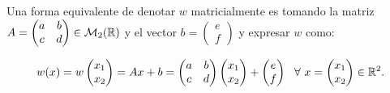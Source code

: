 Una forma equivalente de denotar $w$ matricialmente es tomando la matriz $A=\begin{pmatrix}
    a & b \\
    c & d
\end{pmatrix}\in\mathcal{M}_2(\mathbb{R})$ y el vector $b=\begin{pmatrix}
    e \\
    f
\end{pmatrix}$ y expresar $w$ como:

\begin{equation}
    w(x) =
    w\begin{pmatrix}
        x_1 \\
        x_2
    \end{pmatrix} = Ax + b = \begin{pmatrix}
        a & b \\
        c & d
    \end{pmatrix}\begin{pmatrix}
        x_1 \\
        x_2
    \end{pmatrix}+\begin{pmatrix}
        e \\
        f
    \end{pmatrix} \ \ \forall \ x = \begin{pmatrix}
        x_1 \\
        x_2
    \end{pmatrix}\in\mathbb{R}^2.
\end{equation}


